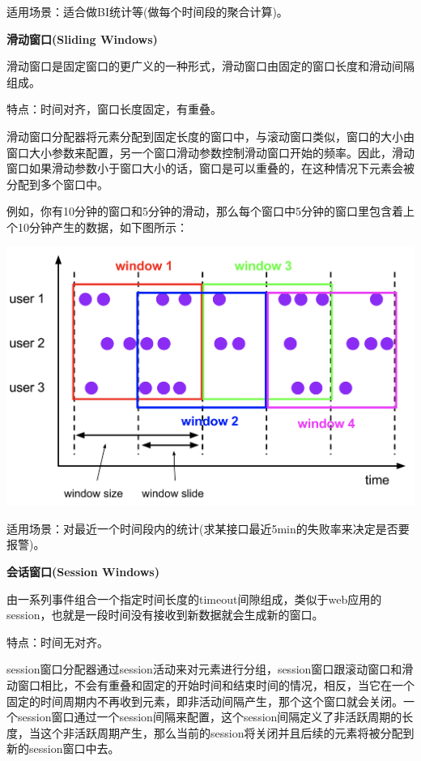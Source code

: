 \documentclass[oneside]{ctexbook}
\begin{document}
适用场景：适合做BI统计等(做每个时间段的聚合计算)。

\textbf{滑动窗口(Sliding Windows)}

滑动窗口是固定窗口的更广义的一种形式，滑动窗口由固定的窗口长度和滑动间隔组成。

特点：时间对齐，窗口长度固定，有重叠。

滑动窗口分配器将元素分配到固定长度的窗口中，与滚动窗口类似，窗口的大小由窗口大小参数来配置，另一个窗口滑动参数控制滑动窗口开始的频率。因此，滑动窗口如果滑动参数小于窗口大小的话，窗口是可以重叠的，在这种情况下元素会被分配到多个窗口中。

例如，你有10分钟的窗口和5分钟的滑动，那么每个窗口中5分钟的窗口里包含着上个10分钟产生的数据，如下图所示：

\noindent \includegraphics[width=\textwidth]{sliding-windows.png}

适用场景：对最近一个时间段内的统计(求某接口最近5min的失败率来决定是否要报警)。

\textbf{会话窗口(Session Windows)}

由一系列事件组合一个指定时间长度的timeout间隙组成，类似于web应用的session，也就是一段时间没有接收到新数据就会生成新的窗口。

特点：时间无对齐。

session窗口分配器通过session活动来对元素进行分组，session窗口跟滚动窗口和滑动窗口相比，不会有重叠和固定的开始时间和结束时间的情况，相反，当它在一个固定的时间周期内不再收到元素，即非活动间隔产生，那个这个窗口就会关闭。一个session窗口通过一个session间隔来配置，这个session间隔定义了非活跃周期的长度，当这个非活跃周期产生，那么当前的session将关闭并且后续的元素将被分配到新的session窗口中去。
\end{document}
